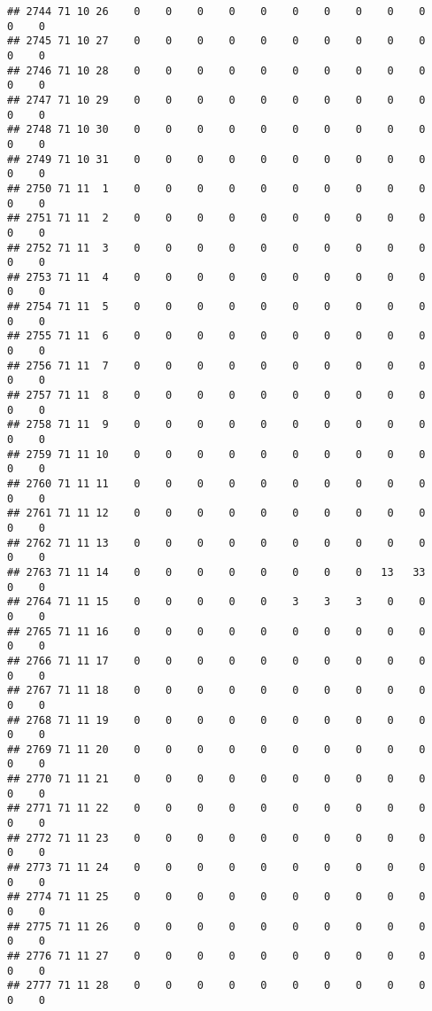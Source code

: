 \documentclass[]{article}
\begin{document}
\begin{verbatim}
## 2744 71 10 26    0    0    0    0    0    0    0    0    0    0    0    0
## 2745 71 10 27    0    0    0    0    0    0    0    0    0    0    0    0
## 2746 71 10 28    0    0    0    0    0    0    0    0    0    0    0    0
## 2747 71 10 29    0    0    0    0    0    0    0    0    0    0    0    0
## 2748 71 10 30    0    0    0    0    0    0    0    0    0    0    0    0
## 2749 71 10 31    0    0    0    0    0    0    0    0    0    0    0    0
## 2750 71 11  1    0    0    0    0    0    0    0    0    0    0    0    0
## 2751 71 11  2    0    0    0    0    0    0    0    0    0    0    0    0
## 2752 71 11  3    0    0    0    0    0    0    0    0    0    0    0    0
## 2753 71 11  4    0    0    0    0    0    0    0    0    0    0    0    0
## 2754 71 11  5    0    0    0    0    0    0    0    0    0    0    0    0
## 2755 71 11  6    0    0    0    0    0    0    0    0    0    0    0    0
## 2756 71 11  7    0    0    0    0    0    0    0    0    0    0    0    0
## 2757 71 11  8    0    0    0    0    0    0    0    0    0    0    0    0
## 2758 71 11  9    0    0    0    0    0    0    0    0    0    0    0    0
## 2759 71 11 10    0    0    0    0    0    0    0    0    0    0    0    0
## 2760 71 11 11    0    0    0    0    0    0    0    0    0    0    0    0
## 2761 71 11 12    0    0    0    0    0    0    0    0    0    0    0    0
## 2762 71 11 13    0    0    0    0    0    0    0    0    0    0    0    0
## 2763 71 11 14    0    0    0    0    0    0    0    0   13   33    0    0
## 2764 71 11 15    0    0    0    0    0    3    3    3    0    0    0    0
## 2765 71 11 16    0    0    0    0    0    0    0    0    0    0    0    0
## 2766 71 11 17    0    0    0    0    0    0    0    0    0    0    0    0
## 2767 71 11 18    0    0    0    0    0    0    0    0    0    0    0    0
## 2768 71 11 19    0    0    0    0    0    0    0    0    0    0    0    0
## 2769 71 11 20    0    0    0    0    0    0    0    0    0    0    0    0
## 2770 71 11 21    0    0    0    0    0    0    0    0    0    0    0    0
## 2771 71 11 22    0    0    0    0    0    0    0    0    0    0    0    0
## 2772 71 11 23    0    0    0    0    0    0    0    0    0    0    0    0
## 2773 71 11 24    0    0    0    0    0    0    0    0    0    0    0    0
## 2774 71 11 25    0    0    0    0    0    0    0    0    0    0    0    0
## 2775 71 11 26    0    0    0    0    0    0    0    0    0    0    0    0
## 2776 71 11 27    0    0    0    0    0    0    0    0    0    0    0    0
## 2777 71 11 28    0    0    0    0    0    0    0    0    0    0    0    0

\end{verbatim}
\end{document}

